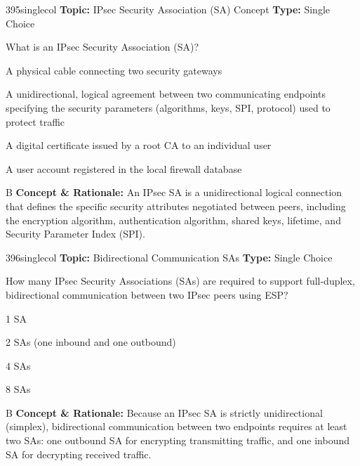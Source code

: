 \begin{qcard}{395}{singlecol}
\textcolor{darkslate!75}{\small\textbf{Topic:} IPsec Security Association (SA) Concept \hfill \textbf{Type:} Single Choice}\vspace{0.4em}\par
What is an IPsec Security Association (SA)?
\begin{qoptions}
\item A physical cable connecting two security gateways
\item A unidirectional, logical agreement between two communicating endpoints specifying the security parameters (algorithms, keys, SPI, protocol) used to protect traffic
\item A digital certificate issued by a root CA to an individual user
\item A user account registered in the local firewall database
\end{qoptions}
\end{qcard}
\nopagebreak
\begin{explainbox}{B}
\textbf{Concept \& Rationale:} An IPsec SA is a unidirectional logical connection that defines the specific security attributes negotiated between peers, including the encryption algorithm, authentication algorithm, shared keys, lifetime, and Security Parameter Index (SPI).
\end{explainbox}

\begin{qcard}{396}{singlecol}
\textcolor{darkslate!75}{\small\textbf{Topic:} Bidirectional Communication SAs \hfill \textbf{Type:} Single Choice}\vspace{0.4em}\par
How many IPsec Security Associations (SAs) are required to support full-duplex, bidirectional communication between two IPsec peers using ESP?
\begin{qoptions}
\item 1 SA
\item 2 SAs (one inbound and one outbound)
\item 4 SAs
\item 8 SAs
\end{qoptions}
\end{qcard}
\nopagebreak
\begin{explainbox}{B}
\textbf{Concept \& Rationale:} Because an IPsec SA is strictly unidirectional (simplex), bidirectional communication between two endpoints requires at least two SAs: one outbound SA for encrypting transmitting traffic, and one inbound SA for decrypting received traffic.
\end{explainbox}

